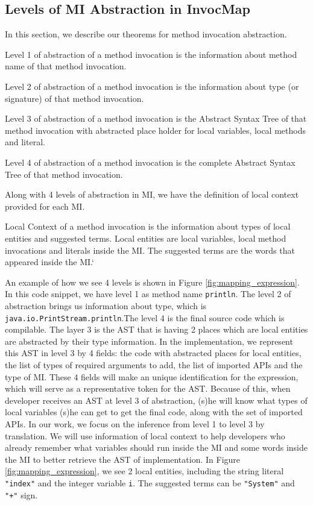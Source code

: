 \subsection{Levels of MI Abstraction in InvocMap}
In this section, we describe our theorems for method invocation abstraction.
\begin{definition}
Level 1 of abstraction of a method invocation is the information about method name of that method invocation.
\end{definition}
\begin{definition}
Level 2 of abstraction of a method invocation is the information about type (or signature) of that method invocation.
\end{definition}
\begin{definition}
Level 3 of abstraction of a method invocation is the Abstract Syntax Tree of that method invocation with abstracted place holder for local variables, local methods and literal.
\end{definition}
\begin{definition}
Level 4 of abstraction of a method invocation is the complete Abstract Syntax Tree of that method invocation.
\end{definition}
Along with 4 levels of abstraction in MI, we have the definition of local context provided for each MI. 
\begin{definition}
Local Context of a method invocation is the information about types of local entities and suggested terms. Local entities are local variables, local method invocations and literals inside the MI. The suggested terms are the words that appeared inside the MI.`
\end{definition}

An example of how we see 4 levels is shown in Figure \ref{fig:mapping_expression}. In this code snippet, we have level 1 as method name \texttt{println}. The level 2 of abstraction brings us information about type, which is \texttt{java.io.PrintStream.println}.The level 4 is the final source code which is compilable. The layer 3 is the AST that is having 2 places which are local entities are abstracted by their type information. In the implementation, we represent this AST in level 3 by 4 fields: the code with abstracted places for local entities, the list of types of required arguments to add, the list of imported APIs and the type of MI. These 4 fields will make an unique identification for the expression, which will serve as a representative token for the AST. Because of this, when developer receives an AST at level 3 of abstraction, (s)he will know what types of local variables (s)he can get to get the final code, along with the set of imported APIs. In our work, we focus on the inference from level 1 to level 3 by translation.
We will use information of local context to help developers who already remember what variables should run inside the MI and some words inside the MI to better retrieve the AST of implementation. In Figure \ref{fig:mapping_expression}, we see 2 local entities, including the string literal \texttt{"index"} and the integer variable \texttt{i}. The suggested terms can be \texttt{"System"} and \texttt{"+"} sign. 



